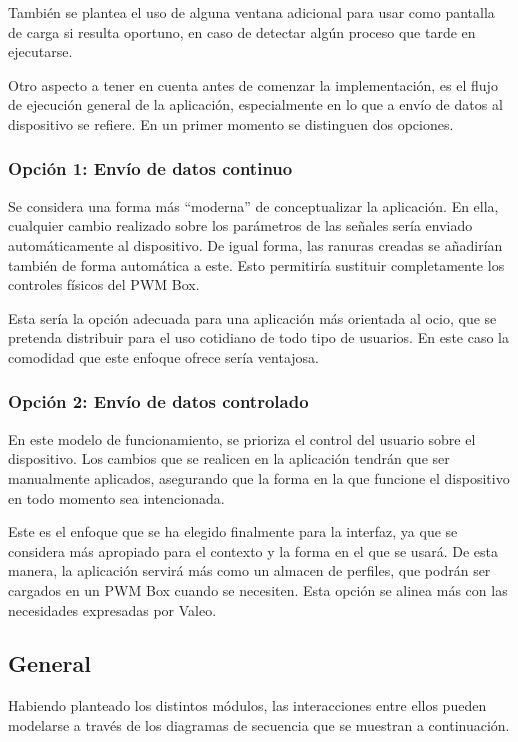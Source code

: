 También se plantea el uso de alguna ventana adicional para usar como pantalla de carga si resulta oportuno, en caso de detectar algún proceso que tarde en ejecutarse.

Otro aspecto a tener en cuenta antes de comenzar la implementación, es el flujo de ejecución general de la aplicación, especialmente en lo que a envío de datos al dispositivo se refiere. En un primer momento se distinguen dos opciones.

\subsubsection{Opción 1: Envío de datos continuo}

Se considera una forma más ``moderna'' de conceptualizar la aplicación. En ella, cualquier cambio realizado sobre los parámetros de las señales sería enviado automáticamente al dispositivo. De igual forma, las ranuras creadas se añadirían también de forma automática a este. Esto permitiría sustituir completamente los controles físicos del PWM Box.

Esta sería la opción adecuada para una aplicación más orientada al ocio, que se pretenda distribuir para el uso cotidiano de todo tipo de usuarios. En este caso la comodidad que este enfoque ofrece sería ventajosa.

\subsubsection{Opción 2: Envío de datos controlado}

En este modelo de funcionamiento, se prioriza el control del usuario sobre el dispositivo. Los cambios que se realicen en la aplicación tendrán que ser manualmente aplicados, asegurando que la forma en la que funcione el dispositivo en todo momento sea intencionada.

Este es el enfoque que se ha elegido finalmente para la interfaz, ya que se considera más apropiado para el contexto y la forma en el que se usará. De esta manera, la aplicación servirá más como un almacen de perfiles, que podrán ser cargados en un PWM Box cuando se necesiten. Esta opción se alinea más con las necesidades expresadas por Valeo.

\subsection{General}

Habiendo planteado los distintos módulos, las interacciones entre ellos pueden modelarse a través de los diagramas de secuencia que se muestran a continuación.

